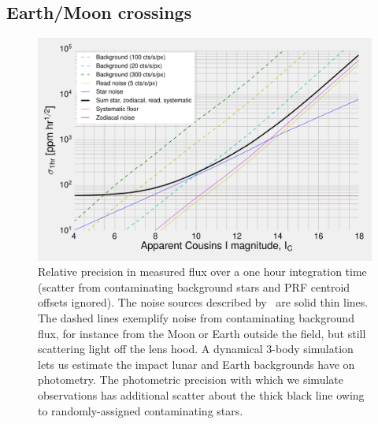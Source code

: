 \subsection{Earth/Moon crossings}
\label{sec:earth_moon_crossings}
\begin{figure}[!tb]
	\centering
	\includegraphics{figures/precision_memo.pdf}
	\caption{Relative precision in measured flux over a one hour integration time (scatter from contaminating background stars and PRF centroid offsets ignored). The noise sources described by~\citet{Sullivan_2015} are solid thin lines. The dashed lines exemplify noise from contaminating background flux, for instance from the Moon or Earth outside the \tess field, but still scattering light off  the \tess lens hood. A dynamical 3-body simulation lets us estimate the impact  lunar and Earth backgrounds have on \tesss photometry.
	The photometric precision with which we simulate observations has additional scatter about the thick black line owing to randomly-assigned contaminating stars.}
	\label{fig:noise_with_moon}
\end{figure}

